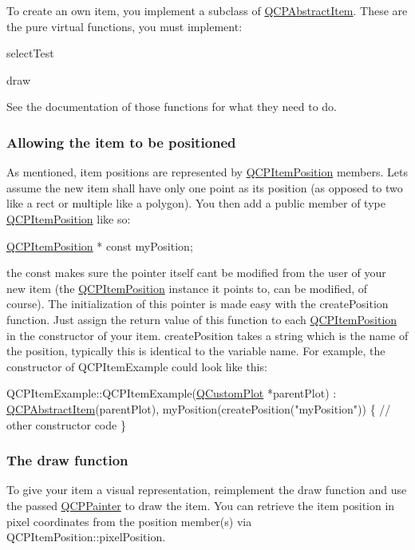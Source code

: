 To create an own item, you implement a subclass of \mbox{\hyperlink{class_q_c_p_abstract_item}{Q\+C\+P\+Abstract\+Item}}. These are the pure virtual functions, you must implement\+: \begin{DoxyItemize}
\item select\+Test \item draw\end{DoxyItemize}
See the documentation of those functions for what they need to do.\hypertarget{class_q_c_p_abstract_item_items-positioning}{}\subsubsection{Allowing the item to be positioned}\label{class_q_c_p_abstract_item_items-positioning}
As mentioned, item positions are represented by \mbox{\hyperlink{class_q_c_p_item_position}{Q\+C\+P\+Item\+Position}} members. Let\textquotesingle{}s assume the new item shall have only one point as its position (as opposed to two like a rect or multiple like a polygon). You then add a public member of type \mbox{\hyperlink{class_q_c_p_item_position}{Q\+C\+P\+Item\+Position}} like so\+:


\begin{DoxyCode}
\mbox{\hyperlink{class_q_c_p_item_position}{QCPItemPosition}} * \textcolor{keyword}{const} myPosition;
\end{DoxyCode}


the const makes sure the pointer itself can\textquotesingle{}t be modified from the user of your new item (the \mbox{\hyperlink{class_q_c_p_item_position}{Q\+C\+P\+Item\+Position}} instance it points to, can be modified, of course). The initialization of this pointer is made easy with the create\+Position function. Just assign the return value of this function to each \mbox{\hyperlink{class_q_c_p_item_position}{Q\+C\+P\+Item\+Position}} in the constructor of your item. create\+Position takes a string which is the name of the position, typically this is identical to the variable name. For example, the constructor of Q\+C\+P\+Item\+Example could look like this\+:


\begin{DoxyCode}
QCPItemExample::QCPItemExample(\mbox{\hyperlink{class_q_custom_plot}{QCustomPlot}} *parentPlot) :
  \mbox{\hyperlink{class_q_c_p_abstract_item}{QCPAbstractItem}}(parentPlot),
  myPosition(createPosition(\textcolor{stringliteral}{"myPosition"}))
\{
  \textcolor{comment}{// other constructor code}
\}
\end{DoxyCode}
\hypertarget{class_q_c_p_abstract_item_items-drawing}{}\subsubsection{The draw function}\label{class_q_c_p_abstract_item_items-drawing}
To give your item a visual representation, reimplement the draw function and use the passed \mbox{\hyperlink{class_q_c_p_painter}{Q\+C\+P\+Painter}} to draw the item. You can retrieve the item position in pixel coordinates from the position member(s) via Q\+C\+P\+Item\+Position\+::pixel\+Position.

